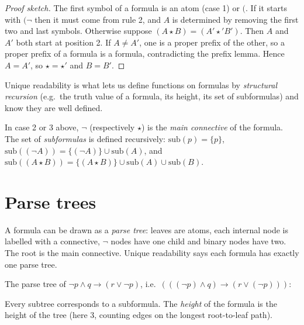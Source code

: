 \begin{proof}[Proof sketch]
The first symbol of a formula is an atom (case 1) or $($. If it starts with $(\neg$ then
it must come from rule 2, and $A$ is determined by removing the first two and last
symbols. Otherwise suppose $(A\star B) = (A'\star' B')$. Then $A$ and $A'$ both start at
position 2. If $A \neq A'$, one is a proper prefix of the other, so a proper prefix of a
formula is a formula, contradicting the prefix lemma. Hence $A=A'$, so $\star=\star'$
and $B=B'$.
\end{proof}

Unique readability is what lets us define functions on formulas by \emph{structural
recursion} (e.g.\ the truth value of a formula, its height, its set of subformulas) and
know they are well defined.

\begin{definition}
In case 2 or 3 above, $\neg$ (respectively $\star$) is the \emph{main connective} of the
formula. The set of \emph{subformulas} is defined recursively:
$\mathrm{sub}(p)=\{p\}$, $\mathrm{sub}((\neg A))=\{(\neg A)\}\cup\mathrm{sub}(A)$, and
$\mathrm{sub}((A\star B)) = \{(A\star B)\}\cup\mathrm{sub}(A)\cup\mathrm{sub}(B)$.
\end{definition}

\section{Parse trees}

A formula can be drawn as a \emph{parse tree}: leaves are atoms, each internal node is
labelled with a connective, $\neg$ nodes have one child and binary nodes have two. The
root is the main connective. Unique readability says each formula has exactly one parse
tree.

\begin{example}
The parse tree of $\neg p \land q \to (r \lor \neg p)$, i.e.\
$(((\neg p)\land q)\to(r\lor(\neg p)))$:
\begin{center}
\end{center}
Every subtree corresponds to a subformula. The \emph{height} of the formula is the height
of the tree (here $3$, counting edges on the longest root-to-leaf path).
\end{example}

